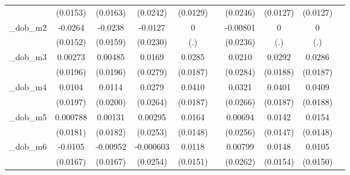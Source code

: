 \begin{table}[htbp]
\begin{tabular}{l*{9}{c}}
            &    (0.0153)         &    (0.0163)         &    (0.0242)         &    (0.0129)         &                     &    (0.0246)         &    (0.0127)         &    (0.0127)         &                     \\
[1em]
\_dob\_m2     &     -0.0264\sym{*}  &     -0.0238         &     -0.0127         &           0         &                     &    -0.00801         &           0         &           0         &                     \\
            &    (0.0152)         &    (0.0159)         &    (0.0230)         &         (.)         &                     &    (0.0236)         &         (.)         &         (.)         &                     \\
[1em]
\_dob\_m3     &     0.00273         &     0.00485         &      0.0169         &      0.0285         &                     &      0.0210         &      0.0292         &      0.0286         &                     \\
            &    (0.0196)         &    (0.0196)         &    (0.0279)         &    (0.0187)         &                     &    (0.0284)         &    (0.0188)         &    (0.0187)         &                     \\
[1em]
\_dob\_m4     &      0.0104         &      0.0114         &      0.0279         &      0.0410\sym{**} &                     &      0.0321         &      0.0401\sym{**} &      0.0409\sym{**} &                     \\
            &    (0.0197)         &    (0.0200)         &    (0.0264)         &    (0.0187)         &                     &    (0.0266)         &    (0.0187)         &    (0.0188)         &                     \\
[1em]
\_dob\_m5     &    0.000788         &     0.00131         &     0.00295         &      0.0164         &                     &     0.00694         &      0.0142         &      0.0154         &                     \\
            &    (0.0181)         &    (0.0182)         &    (0.0253)         &    (0.0148)         &                     &    (0.0256)         &    (0.0147)         &    (0.0148)         &                     \\
[1em]
\_dob\_m6     &     -0.0105         &    -0.00952         &   -0.000603         &      0.0118         &                     &     0.00799         &      0.0148         &      0.0105         &                     \\
            &    (0.0167)         &    (0.0167)         &    (0.0254)         &    (0.0151)         &                     &    (0.0262)         &    (0.0154)         &    (0.0150)         &                     \\

\end{tabular}
\end{table}
